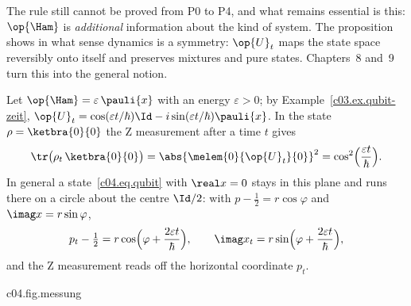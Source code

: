 The rule still cannot be proved from P0 to P4, and what remains essential is this: $\op{\Ham}$ is
\emph{additional} information about the kind of system. The proposition shows in what sense
dynamics is a symmetry: $\op{U}_t$ maps the state space reversibly onto itself and preserves
mixtures and pure states. Chapters~8 and~9 turn this into the general notion.

\begin{example}\label{c04.ex.qubit-dynamik}
  Let $\op{\Ham} = \varepsilon\,\pauli{x}$ with an energy $\varepsilon > 0$; by
  Example~\ref{c03.ex.qubit-zeit},
  $\op{U}_t = \cos(\varepsilon t/\hbar)\Id - i\sin(\varepsilon t/\hbar)\pauli{x}$. In the state
  $\rho = \ketbra{0}{0}$ the Z measurement after a time $t$ gives
  \begin{equation}\label{c04.eq.rabi}
    \tr\bigl(\rho_t\,\ketbra{0}{0}\bigr) = \abs{\melem{0}{\op{U}_t}{0}}^2 = \cos^2\Bigl(\frac{\varepsilon t}{\hbar}\Bigr) .
  \end{equation}
  In general a state~\eqref{c04.eq.qubit} with $\real x = 0$ stays in this plane and runs there on
  a circle about the centre $\Id/2$: with $p - \tfrac12 = r\cos\varphi$ and
  $\imag x = r\sin\varphi$,
  \begin{equation}\label{c04.eq.kreis}
    p_t - \tfrac12 = r\cos\Bigl(\varphi + \frac{2\varepsilon t}{\hbar}\Bigr) ,
    \qquad
    \imag x_t = r\sin\Bigl(\varphi + \frac{2\varepsilon t}{\hbar}\Bigr) ,
  \end{equation}
  and the Z measurement reads off the horizontal coordinate $p_t$.
\end{example}

\begin{tpcfigure}{c04.fig.messung}
  \caption{What the postulates P2, P4 and P5 fix together, for a qubit with
    $\op{\Ham} = \varepsilon\,\pauli{x}$ and the Z measurement $\op{\EffOp} = \ketbra{0}{0}$. (a) The
    states~\eqref{c04.eq.qubit} with $\real x = 0$: positivity, Equation~\eqref{c04.eq.det}, cuts
    out a disc of radius $\tfrac12$ about $\Id/2$; outside it (hatched) lie Hermitian matrices with
    trace one that are not states. The boundary consists of the pure states. $\op{U}_t$ rotates the
    disc about its centre, Equation~\eqref{c04.eq.kreis}; the circles are the orbits of the pure
    state $\ketbra{0}{0}$ (solid) and of a mixed state $\rho$ with $r = \tfrac{3}{10}$ (dotted).
    (b) The detection probability $\tr(\rho_t\op{\EffOp}) = p_t$ against time, in units of
    $\hbar/\varepsilon$: the distance $r$ from the centre in (a) is the amplitude in (b). The pure
    state oscillates between $0$ and $1$, Equation~\eqref{c04.eq.rabi}; the maximally mixed state
    $\Id/2$ always answers with $\tfrac12$ (horizontal line).}
\end{tpcfigure}

